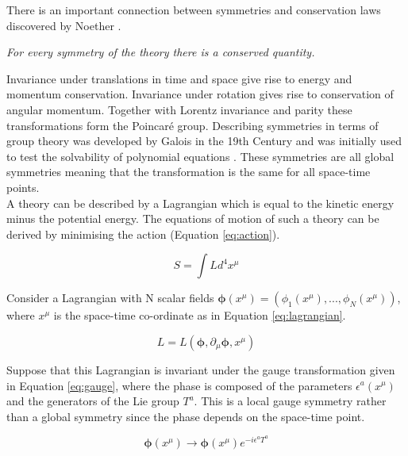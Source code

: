 There is an important connection between symmetries and conservation laws
discovered by Noether \cite{noether}.

\begin{center}
{\it For every symmetry of the theory there is a conserved quantity.} \\
\end{center}

Invariance under translations in time and space give rise to energy and momentum
conservation. Invariance under rotation gives rise to conservation of angular
momentum. Together with Lorentz invariance and parity these transformations form 
the Poincar\'{e} group. Describing symmetries in terms of group theory was 
developed by Galois in the 19th Century and was initially used to test the 
solvability of polynomial equations \cite{galois}. These symmetries are all 
global symmetries meaning that the transformation is the same for all space-time 
points. \\

A theory can be described by a Lagrangian which is equal to the kinetic energy
minus the potential energy. The equations of motion of such a theory can be
derived by minimising the action (Equation \ref{eq:action}).

\begin{equation}
S = \int L d^{4}x^{\mu}
\label{eq:action}
\end{equation}

Consider a Lagrangian with N scalar fields $\boldsymbol\phi(x^{\mu}) =
\left(\phi_{1}(x^{\mu}),...,\phi_{N}(x^{\mu})\right)$, where $x^{\mu}$ is the
space-time co-ordinate as in Equation \ref{eq:lagrangian}.

\begin{equation}
L = L(\boldsymbol\phi, \partial_{\mu}\boldsymbol\phi, x^{\mu})
\label{eq:lagrangian}
\end{equation}

Suppose that this Lagrangian is invariant under the gauge transformation given
in Equation \ref{eq:gauge}, where the phase is composed of the parameters 
$\epsilon^{a}\left(x^{\mu}\right)$ and the generators of the Lie group $T^{a}$. 
This is a local gauge symmetry rather than a global symmetry since the phase 
depends on the space-time point. 

\begin{equation} 
\boldsymbol\phi(x^{\mu})\rightarrow \boldsymbol\phi(x^{\mu})e^{-i\epsilon^{a}T^{a}}
\label{eq:gauge}
\end{equation}

